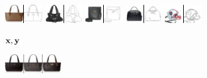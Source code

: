   \clearpage
\newcommand{\edgesstuffimgheight}{0.8cm}
  \begin{figure}[t]
    \centering
    \begin{subfigure}[t]{0.15\textwidth}
      \centering
      \includegraphics[height=\edgesstuffimgheight]{figs/cigcvae/image-samples/bags/image_aipo_0_imagenet_gt_masked.png}
      \includegraphics[height=\edgesstuffimgheight]{figs/cigcvae/image-samples/bags/image_aipo_1_imagenet_gt_masked.png}
      \includegraphics[height=\edgesstuffimgheight]{figs/cigcvae/image-samples/bags/image_aipo_2_imagenet_gt_masked.png}
      \includegraphics[height=\edgesstuffimgheight]{figs/cigcvae/image-samples/bags/image_aipo_3_imagenet_gt_masked.png}
      \includegraphics[height=\edgesstuffimgheight]{figs/cigcvae/image-samples/bags/image_aipo_4_imagenet_gt_masked.png}
      \caption{$\mathbf{x}, \mathbf{y}$}
    \end{subfigure}
    \begin{subfigure}[t]{0.27\textwidth}
      \centering
      \includegraphics[height=\edgesstuffimgheight]{figs/cigcvae/image-samples/bags/image_aipo_0_t=0.85_imagenet_samples.png}

\end{subfigure}
\end{figure}
